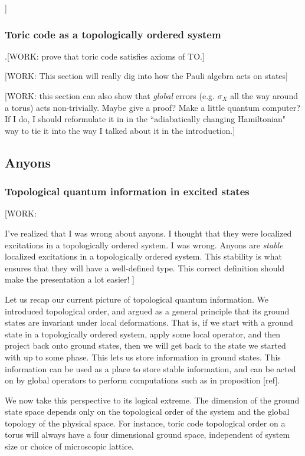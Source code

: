 ]

\subsubsection{Toric code as a topologically ordered system}

.[WORK: prove that toric code satisfies axioms of TO.]

[WORK: This section will really dig into how the Pauli algebra acts on states]

[WORK: this section can also show that \textit{global} errors (e.g. $\sigma_X$ all the way around a torus) acts non-trivially. Maybe give a proof? Make a little quantum computer? If I do, I should reformulate it in in the ``adiabatically changing Hamiltonian" way to tie it into the way I talked about it in the introduction.]



\subsection{Anyons}

\subsubsection{Topological quantum information in excited states}

[WORK:

I've realized that I was wrong about anyons. I thought that they were localized excitations in a topologically ordered system. I was wrong. Anyons are \textit{stable} localized excitations in a topologically ordered system. This stability is what ensures that they will have a well-defined type. This correct definition should make the presentation a lot easier!
]

Let us recap our current picture of topological quantum information. We introduced topological order, and argued as a general principle that its ground states are invariant under local deformations. That is, if we start with a ground state in a topologically ordered system, apply some local operator, and then project back onto ground states, then we will get back to the state we started with up to some phase. This lets us store information in ground states. This information can be used as a place to store stable information, and can be acted on by global operators to perform computations such as in proposition [ref].

We now take this perspective to its logical extreme. The dimension of the ground state space depends only on the topological order of the system and the global topology of the physical space. For instance, toric code topological order on a torus will always have a four dimensional ground space, independent of system size or choice of microscopic lattice.


